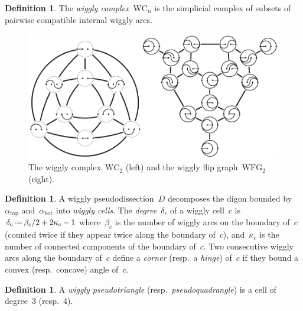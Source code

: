 \documentclass[submission]{FPSAC2025}
\theoremstyle{definition}
\newtheorem{definition}[theorem]{Definition}
\newcommand{\eqdef}{\mbox{\,\raisebox{0.2ex}{\scriptsize\ensuremath{\mathrm:}}\ensuremath{=}\,}} %
\newcommand{\darkblue}{\color{darkblue}} %
\newcommand{\defn}[1]{\textsl{\darkblue #1}} %
\newcommand{\wigglyComplex}{\mathrm{WC}} %
\newcommand{\wigglyFlipGraph}{\mathrm{WFG}} %
\begin{document}
\begin{definition}
\label{def:wigglyComplex}
The \defn{wiggly complex}~$\wigglyComplex_n$ is the simplicial complex of subsets of pairwise compatible internal wiggly arcs.

\begin{figure}
\centerline{\includegraphics[scale=1.1]{wigglyComplex}}
\caption{The wiggly complex~$\wigglyComplex_2$ (left) and the wiggly flip graph~$\wigglyFlipGraph_2$ (right).}
\label{fig:wigglyComplex}
\end{figure}
\end{definition}

\begin{definition}
A wiggly pseudodissection~$D$ decomposes the digon bounded by~$\alpha_\mathrm{top}$ and~$\alpha_\mathrm{bot}$ into \defn{wiggly cells}.
The \defn{degree}~$\delta_c$ of a wiggly cell~$c$ is~$\delta_c \eqdef \beta_c/2+2\kappa_c-1$ where~$\beta_c$ is the number of wiggly arcs on the boundary of~$c$ (counted twice if they appear twice along the boundary of~$c$), and~$\kappa_c$ is the number of connected components of the boundary of~$c$.
Two consecutive wiggly arcs along the boundary of~$c$ define a \defn{corner} (resp.~a \defn{hinge}) of~$c$ if they bound a convex (resp.~concave) angle of~$c$.
\end{definition}

\begin{definition}
A \defn{wiggly pseudotriangle} (resp.~\defn{pseudoquadrangle}) is a cell of degree~$3$ (resp.~$4$).
\end{definition}
\end{document}
